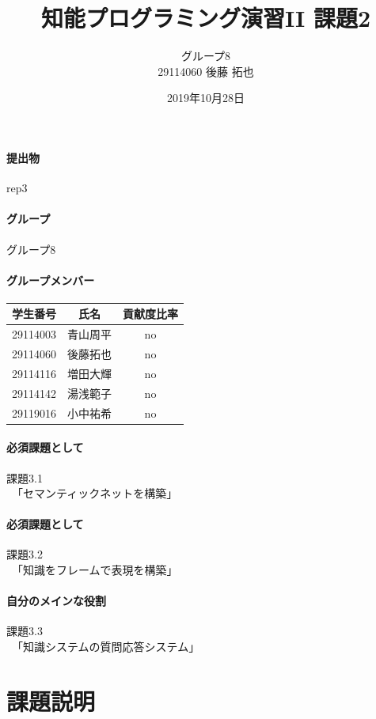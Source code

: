 \documentclass[uplatex,12pt]{jsarticle}
\title{知能プログラミング演習II 課題2}
\author{グループ8\\
  29114060 後藤 拓也\\
}
\date{2019年10月28日}
\begin{document}
\maketitle

\paragraph{提出物} rep3

\paragraph{グループ} グループ8

\paragraph{グループメンバー}
\begin{center}
\begin{tabular}{|c|c|c|}
  \hline
  学生番号&氏名&貢献度比率\\
  \hline\hline
  29114003&青山周平&no\\
  \hline
  29114060&後藤拓也&no\\
  \hline
  29114116&増田大輝&no\\
  \hline
  29114142&湯浅範子&no\\
  \hline
  29119016&小中祐希&no\\
  \hline
\end{tabular}
\end{center}
\paragraph{必須課題として} 課題3.1
\\　「セマンティックネットを構築」
\paragraph{必須課題として} 課題3.2
\\　「知識をフレームで表現を構築」
\paragraph{自分のメインな役割} 課題3.3
\\　「知識システムの質問応答システム」
\section{課題説明}
\end{document}

